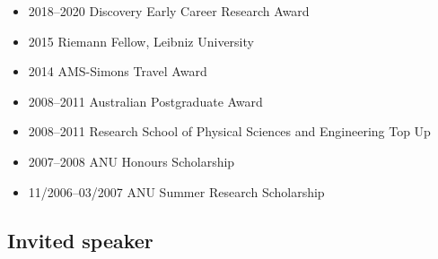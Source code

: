 \documentclass[12pt]{article}
\begin{document}
\begin{itemize}
\item 2018--2020 Discovery Early Career Research Award
\item 2015 Riemann Fellow, Leibniz University
\item 2014 AMS-Simons Travel Award
\item 2008--2011 Australian Postgraduate Award
\item 2008--2011 Research School of Physical Sciences and Engineering Top Up
\item 2007--2008 ANU Honours Scholarship
\item 11/2006--03/2007 ANU Summer Research Scholarship
\end{itemize}

\subsection*{Invited speaker}
\label{sec:orgheadline4}
\end{document}
